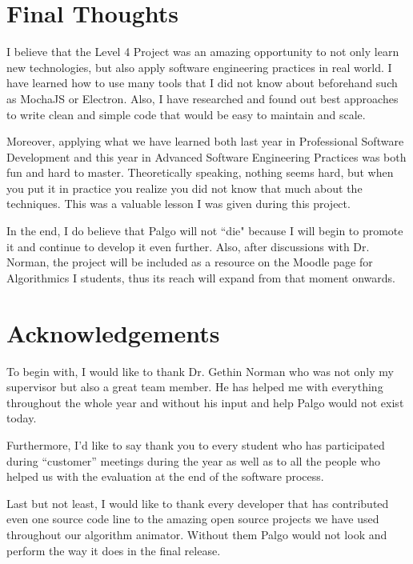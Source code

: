 \documentclass{l4proj}
\begin{document}
\section{Final Thoughts}

I believe that the Level 4 Project was an amazing opportunity to not only learn new technologies, but also apply
software engineering practices in real
world. I have learned how to use many tools that I did not know about beforehand such as MochaJS or Electron. Also, I
have researched and found out best approaches to write clean and simple code that would be easy to maintain and scale. 

Moreover, applying what we have learned both last year in Professional Software Development and this year in Advanced Software Engineering Practices was both fun and hard to master.
Theoretically speaking, nothing seems hard, but when you put it in practice you realize you did not know that much about
the techniques. This was a valuable lesson I was given during this project.

In the end, I do believe that Palgo will not ``die" because I will begin to promote it and continue to develop it even
further. Also, after discussions with Dr. Norman, the project will be included as a resource on the Moodle page for
Algorithmics I students, thus its reach will expand from that moment onwards.

\section{Acknowledgements}

To begin with, I would like to thank Dr. Gethin Norman who was not only my supervisor but also a great team member. He
has helped me with everything throughout the whole year and without his input and help Palgo would not exist today.

Furthermore, I'd like to say thank you to every student who has participated during ``customer'' meetings during the year
as well as to all the people who helped us with the evaluation at the end of the software process.

Last but not least, I would like to thank every developer that has contributed even one source code line to the amazing open source projects
we have used throughout our algorithm animator. Without them Palgo would not look and perform the way it does in
the final release.

\end{document}
